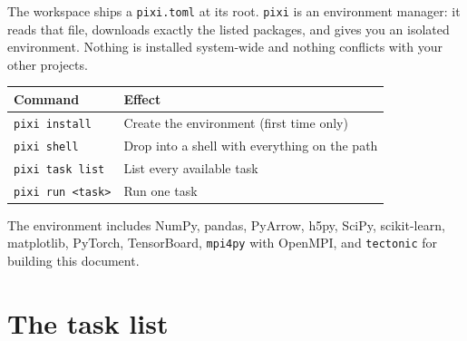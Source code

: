 \documentclass[11pt,a4paper]{report}
\newcommand{\code}[1]{\texttt{#1}}
\renewcommand{\_}{\origtextunderscore\allowbreak}
\begin{document}
The workspace ships a \code{pixi.toml} at its root. \code{pixi} is an environment manager: it
reads that file, downloads exactly the listed packages, and gives you an isolated environment.
Nothing is installed system-wide and nothing conflicts with your other projects.

\begin{center}
\begin{tabular}{@{}ll@{}}
\toprule
\textbf{Command} & \textbf{Effect} \\
\midrule
\code{pixi install} & Create the environment (first time only) \\
\code{pixi shell}   & Drop into a shell with everything on the path \\
\code{pixi task list} & List every available task \\
\code{pixi run <task>} & Run one task \\
\bottomrule
\end{tabular}
\end{center}

The environment includes NumPy, pandas, PyArrow, h5py, SciPy, scikit-learn, matplotlib,
PyTorch, TensorBoard, \code{mpi4py} with OpenMPI, and \code{tectonic} for building this
document.

\section{The task list}
\end{document}
